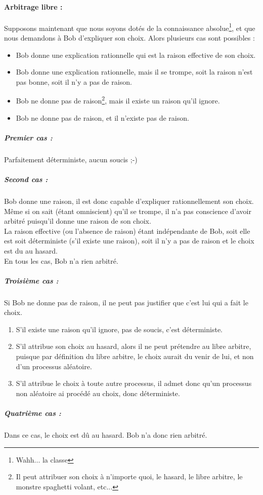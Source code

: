 \documentclass{article}
\begin{document}
\paragraph{Arbitrage libre :}
Supposons maintenant que nous soyons dotés de la connaissance absolue\footnote{
Wahh... la classe}, et que nous demandons à Bob d'expliquer son choix. Alors 
plusieurs cas sont possibles : 
\begin{itemize}
	\item Bob donne une explication rationnelle qui est la raison effective 
		de son choix.
	\item Bob donne une explication rationnelle, mais il se trompe, soit la 
		raison n'est pas bonne, soit il n'y a pas de raison. 
	\item Bob ne donne pas de raison\footnote{Il peut attribuer son choix à 
		n'importe quoi, le hasard, le libre arbitre, le monstre 
	spaghetti volant, etc...}, mais il existe un raison qu'il ignore.
	\item Bob ne donne pas de raison, et il n'existe pas de raison.
\end{itemize}
\subparagraph{Premier cas : }
Parfaitement déterministe, aucun soucis ;-)
\subparagraph{Second cas : }
Bob donne une raison, il est donc capable d'expliquer rationnellement son choix.
Même si on sait (étant omniscient) qu'il se trompe, il n'a pas conscience 
d'avoir arbitré puisqu'il donne une raison de son choix.\\
La raison effective (ou l'absence de raison) étant indépendante de Bob, soit 
elle est soit déterministe (s'il existe une raison), soit il n'y a pas de raison
et le choix est du au hasard.\\
En tous les cas, Bob n'a rien arbitré.
\subparagraph{Troisième cas : }
Si Bob ne donne pas de raison, il ne peut pas justifier que c'est lui qui a fait
le choix. 
\begin{enumerate}
	\item S'il existe une raison qu'il ignore, pas de soucis, c'est 
		déterministe.
	\item S'il attribue son choix au hasard, alors il ne peut prétendre au 
		libre arbitre, puisque par définition du libre arbitre, le choix
		aurait du venir de lui, et non d'un processus aléatoire.
	\item S'il attribue le choix à toute autre processus, il admet donc 
		qu'un processus non aléatoire ai procédé au choix, donc 
		déterministe.
\end{enumerate}
\subparagraph{Quatrième cas : }
Dans ce cas, le choix est dû au hasard. Bob n'a donc rien arbitré.
\end{document}
